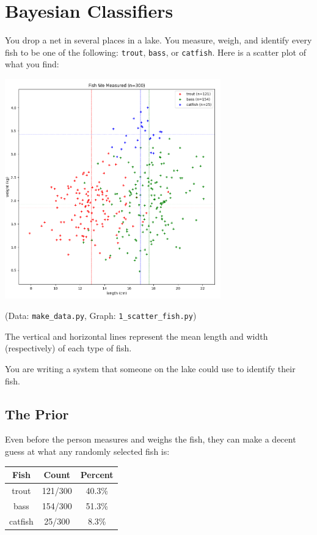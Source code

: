 \chapter{Bayesian Classifiers}
  
You drop a net in several places in a lake.   You measure, weigh, and identify every fish to be one of the following: \texttt{trout}, \texttt{bass}, or \texttt{catfish}.  Here is a scatter plot of what you find:

\includegraphics[width=0.7\textwidth]{1_scatter.png}

(Data: \texttt{make\_data.py}, Graph: \texttt{1\_scatter\_fish.py})

The vertical and horizontal lines represent the mean length and width (respectively) of each type of fish.

You are writing a system that someone on the lake could use to identify their fish.

\section{The Prior}

Even before the person measures and weighs the fish,  they can make a decent guess at what any randomly selected fish is:

\begin{tabular}{c | c | c}
Fish & Count & Percent \\
\hline
trout & 121/300 & 40.3\% \\
bass & 154/300 & 51.3\% \\
catfish & 25/300 & 8.3\%
\end{tabular}

